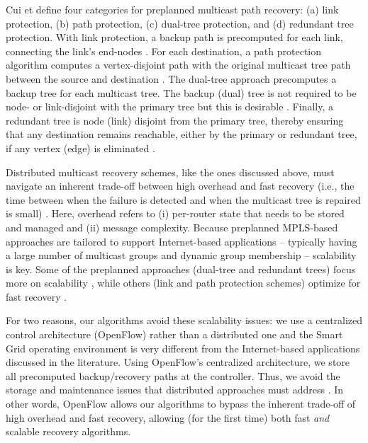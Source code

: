 Cui et \cite{Cui04} define four categories for preplanned multicast path recovery: (a) link protection, (b) path protection, (c) dual-tree protection, and (d) redundant tree protection.
With link protection, a backup path is precomputed for each link, connecting the link's end-nodes \cite{Pointurier02,Wu97}. 
For each destination, a path protection algorithm computes a vertex-disjoint path with the original multicast tree path between the source and destination \cite{Wu97}. 
The dual-tree approach precomputes a backup tree for each multicast tree. The backup (dual) tree is not required to be node- or link-disjoint with the primary tree but this is desirable \cite{Fei01}.
Finally, a redundant tree is node (link) disjoint from the primary tree, thereby ensuring that any destination remains reachable, either by the primary or redundant tree, if any vertex 
(edge) is eliminated \cite{Medard99}. 

Distributed multicast recovery schemes, like the ones discussed above, must navigate an inherent trade-off between high overhead and fast recovery (i.e., the time between when the failure is detected and when the
multicast tree is repaired is small) \cite{Cui04}. 
Here, overhead refers to (i) per-router state that needs to be stored and managed and (ii) message complexity. %
Because preplanned MPLS-based approaches are tailored to support Internet-based applications -- typically having a large number of multicast groups and dynamic group membership -- scalability is key.
Some of the preplanned approaches (dual-tree and redundant trees) focus more on scalability \cite{Cui04,Fei01,Medard99}, while others 
(link and path protection schemes) optimize for fast recovery \cite{Pointurier02,Wu97}.  


For two reasons, our algorithms avoid these scalability issues: we use a centralized control architecture (OpenFlow) rather than a distributed one
and the Smart Grid operating environment is very different from the Internet-based applications discussed in the literature.
Using OpenFlow's centralized architecture, we store all precomputed backup/recovery paths at the controller.  
Thus, we avoid the storage and maintenance issues that distributed approaches must address  \cite{Cui04,Fei01,Pointurier02,Wu97}.
In other words, OpenFlow allows our algorithms to bypass the inherent trade-off of high overhead and fast recovery, allowing (for the first time) both fast \emph{and} scalable recovery algorithms.

